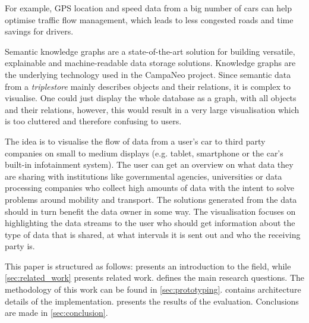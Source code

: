 \documentclass[../paper.tex]{subfiles}
\begin{document}
  For example, GPS location and speed data from a big number of cars can help
  optimise traffic flow management, which leads to less congested roads and
  time savings for drivers.

  Semantic knowledge graphs are a state-of-the-art solution for building
  versatile, explainable and machine-readable data storage solutions. Knowledge
  graphs are the underlying technology used in the CampaNeo project. Since
  semantic data from a \textit{triplestore} mainly describes objects and their
  relations, it is complex to visualise. One could just display the whole
  database as a graph, with all objects and their relations, however, this
  would result in a very large visualisation which is too cluttered and
  therefore confusing to users. %

  The idea is to visualise the flow of data from a user’s car to third party
  companies on small to medium displays (e.g. tablet, smartphone or the car’s
  built-in infotainment system). The user can get an overview on what data they
  are sharing with institutions like governmental agencies, universities or
  data processing companies who collect high amounts of data with the intent to
  solve problems around mobility and transport. The solutions generated from
  the data should in turn benefit the data owner in some way. The visualisation
  focuses on highlighting the data streams to the user who should get
  information about the type of data that is shared, at what intervals it is
  sent out and who the receiving party is.

  This paper is structured as follows:  presents an
  introduction to the field, while \cref{sec:related_work} presents related
  work.  defines the main research questions. The
  methodology of this work can be found in \cref{sec:prototyping}.
   contains architecture details of the
  implementation.  presents the results of the evaluation.
  Conclusions are made in \cref{sec:conclusion}.
\end{document}
